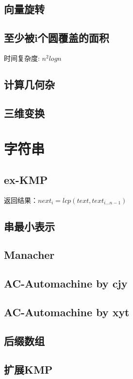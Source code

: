 \documentclass[landscape,a4paper]{article}
\begin{document}
\begin{spacing}{0.3}
\begin{multicols}{2}
		\subsection{向量旋转}
		
		\subsection{至少被i个圆覆盖的面积}
		时间复杂度: $n^2logn$
		
		\subsection{计算几何杂}
		
		\subsection{三维变换}
		
	\section{字符串}
		\subsection{ex-KMP}
		返回结果：$next_i = lcp(text, text_{i \dots n-1})$
		
		\subsection{串最小表示}
		
		\subsection{Manacher}
		
		\subsection{AC-Automachine by cjy}
		
		\subsection{AC-Automachine by xyt}
		
		\subsection{后缀数组}
		
		\subsection{扩展KMP}
		

\end{multicols}
\end{spacing}
\end{document}
